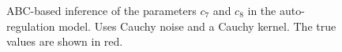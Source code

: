 \begin{figure}[htp]%
    \centering
    \qquad
    \caption{ABC-based inference of the parameters $c_7$ and $c_8$ in the auto-regulation model. Uses Cauchy noise and a Cauchy kernel. The true values are shown in red.}%
    \label{fig:ar-abcmh-cauchy-cauchy-3}%
\end{figure}
